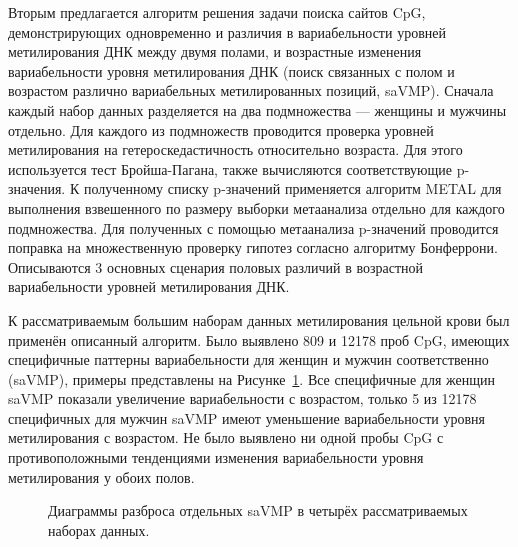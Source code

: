 Вторым предлагается алгоритм решения задачи поиска сайтов CpG, демонстрирующих одновременно и различия в вариабельности уровней метилирования ДНК между двумя полами, и возрастные изменения вариабельности уровня метилирования ДНК (поиск связанных с полом и возрастом различно вариабельных метилированных позиций, saVMP). Сначала каждый набор данных разделяется на два подмножества --- женщины и мужчины отдельно. Для каждого из подмножеств проводится проверка уровней метилирования на гетероскедастичность относительно возраста. Для этого используется тест Бройша-Пагана, также вычисляются соответствующие p-значения. К полученному списку p-значений применяется алгоритм METAL для выполнения взвешенного по размеру выборки метаанализа отдельно для каждого подмножества. Для полученных с помощью метаанализа p-значений проводится поправка на множественную проверку гипотез согласно алгоритму Бонферрони. Описываются 3 основных сценария половых различий в возрастной вариабельности уровней метилирования ДНК.

К рассматриваемым большим наборам данных метилирования цельной крови был применён описанный алгоритм. Было выявлено 809 и 12178 проб CpG, имеющих специфичные паттерны вариабельности для женщин и мужчин соответственно (saVMP), примеры представлены на Рисунке~\ref{fig:saVMP_synopsis}. Все специфичные для женщин saVMP показали увеличение вариабельности с возрастом, только 5 из 12178 специфичных для мужчин saVMP имеют уменьшение вариабельности уровня метилирования с возрастом. Не было выявлено ни одной пробы CpG с противоположными тенденциями изменения вариабельности уровня метилирования у обоих полов. 

\begin{figure}[ht]
	\caption{Диаграммы разброса отдельных saVMP в четырёх рассматриваемых наборах данных.}\label{fig:saVMP_synopsis}
\end{figure}

